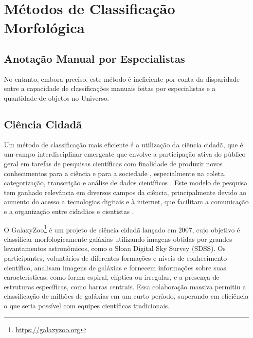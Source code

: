 \section{Métodos de Classificação Morfológica}
\label{sec:classificao}

\lipsum[1]




\subsection{Anotação Manual por Especialistas}
\label{sec:classificacao-manual}

\lipsum[1-2]

No entanto, embora preciso, este método é ineficiente por conta da disparidade entre a capacidade de classificações manuais feitas por especialistas e a quantidade de objetos no Universo.




\subsection{Ciência Cidadã}
\label{sec:classificacao-cs}
Um método de classificação mais eficiente é a utilização da ciência cidadã, que é um campo interdisciplinar emergente que envolve a participação ativa do público geral em tarefas de pesquisas científicas com finalidade de produzir novos conhecimentos para a ciência e para a sociedade \cite{scs-1}, especialmente na coleta, categorização, transcrição e análise de dados científicos \cite{silvertown2009,bonney2014}. Este modelo de pesquisa tem ganhado relevância em diversos campos da ciência, principalmente devido ao aumento do acesso a tecnologias digitais e à internet, que facilitam a comunicação e a organização entre cidadãos e cientistas \cite{scs-4}.

O GalaxyZoo\footnote{\url{https://galaxyzoo.org}} \cite{gz} é um projeto de ciência cidadã lançado em 2007, cujo objetivo é classificar morfologicamente galáxias utilizando imagens obtidas por grandes levantamentos astronômicos, como o Sloan Digital Sky Survey (SDSS). Os participantes, voluntários de diferentes formações e níveis de conhecimento científico, analisam imagens de galáxias e fornecem informações sobre suas características, como forma espiral, elíptica ou irregular, e a presença de estruturas específicas, como barras centrais. Essa colaboração massiva permitiu a classificação de milhões de galáxias em um curto período, superando em eficiência o que seria possível com equipes científicas tradicionais.

